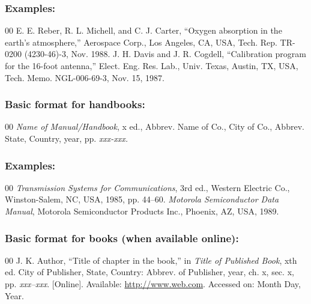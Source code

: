 \documentclass{IEEEoj-data}
\begin{document}
{\subsubsection*{Examples:}

\begin{thebibliography}{00}
 E. E. Reber, R. L. Michell, and C. J. Carter, ``Oxygen absorption in the earth's atmosphere,'' Aerospace Corp., Los Angeles, CA, USA, Tech. Rep. TR-0200 (4230-46)-3, Nov. 1988.
 J. H. Davis and J. R. Cogdell, ``Calibration program for the 16-foot antenna,'' Elect. Eng. Res. Lab., Univ. Texas, Austin, TX, USA, Tech. Memo. NGL-006-69-3, Nov. 15, 1987.
\end{thebibliography}

\subsubsection*{Basic format for handbooks:}

\begin{thebibliography}{00}
 \textit{Name of Manual/Handbook}, x ed., Abbrev. Name of Co., City of Co., Abbrev. State, Country, year, pp.
\textit{xxx-xxx.}
\end{thebibliography}

\subsubsection*{Examples:}

\begin{thebibliography}{00}
 \textit{Transmission Systems for Communications}, 3rd ed., Western Electric Co., Winston-Salem, NC, USA, 1985, pp. 44--60.
 \textit{Motorola Semiconductor Data Manual}, Motorola Semiconductor Products Inc., Phoenix, AZ, USA, 1989.
\end{thebibliography}

\subsubsection*{Basic format for books (when available online): }

\begin{thebibliography}{00}
 J. K. Author, ``Title of chapter in the book,'' in \textit{Title of Published Book}, xth ed. City of
Publisher, State, Country: Abbrev. of Publisher, year, ch. x, sec. x, pp.
\textit{xxx--xxx}. [Online]. Available: \underline {http://www.web.com}. Accessed on: Month
Day, Year.
\end{thebibliography}

}
\end{document}
